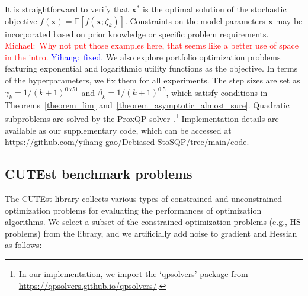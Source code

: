 \documentclass[aos]{imsart}
\numberwithin{equation}{section}
\theoremstyle{plain}
\newcommand{\michael}[1]{\textcolor{red}{Michael:\ #1}}
\newcommand{\yihang}[1]{\textcolor{blue}{Yihang:\ #1}}
\begin{document}
It is straightforward to verify that  $\bm{x}^{*}$ is the optimal solution of the stochastic objective $f(\bm{x}) = \mathbb{E}\left[ f(\bm{x};\zeta_k) 
 \right]$. Constraints on the model parameters $\bm{x}$ may be incorporated based on prior knowledge or specific problem requirements.
\michael{Why not put those examples here, that seems like a better use of space in the intro.} \yihang{fixed.}
We also explore portfolio optimization problems featuring exponential and logarithmic utility functions as the objective. 
In terms of the hyperparameters, we fix them for all experiments. 
The step sizes are set as $\gamma_k = 1/(k+1)^{0.751}$ and $\beta_k = 1 / (k+1)^{0.5}$, which satisfy conditions in Theorems~\ref{theorem_lim} and~\ref{theorem_asymptotic_almost_sure}. 
Quadratic subproblems are solved by the ProxQP solver \cite{bambade2022prox}.\footnote{In our implementation, we import the `qpsolvers' package from \url{https://qpsolvers.github.io/qpsolvers/}.} 
Implementation details are available as our supplementary code, which can be accessed at \url{https://github.com/yihang-gao/Debiased-StoSQP/tree/main/code}.


\subsection{CUTEst benchmark problems}
The CUTEst library collects various types of constrained and unconstrained optimization problems for evaluating the performances of optimization algorithms. 
We select a subset of the constrained optimization problems (e.g., HS problems) from the library, and we artificially add noise to gradient and Hessian as follows:
\end{document}
